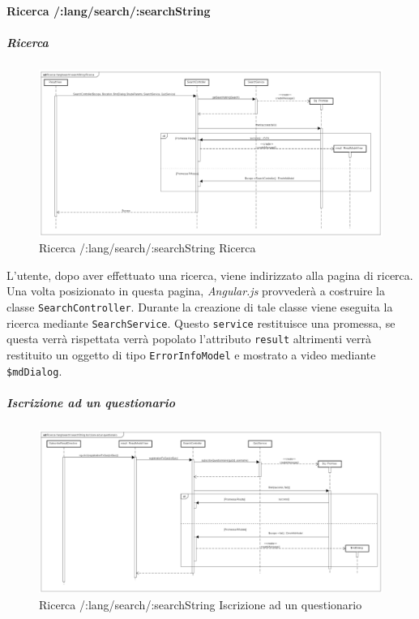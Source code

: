 \paragraph{Ricerca /:lang/search/:searchString}

\subparagraph{Ricerca}

\label{Ricerca /:lang/search/:searchString Ricerca}

\begin{figure}[ht]
	\centering
	\includegraphics[scale=0.275,keepaspectratio]{UML/DiagrammiDiSequenza/Front-End/Search.png}
	\caption{Ricerca /:lang/search/:searchString Ricerca}
\end{figure} \FloatBarrier

L'utente, dopo aver effettuato una ricerca, viene indirizzato alla pagina di ricerca. Una volta posizionato in questa pagina, \textit{Angular.js} provvederà a costruire la classe \texttt{SearchController}. Durante la creazione di tale classe viene eseguita la ricerca mediante \texttt{SearchService}. Questo \texttt{service} restituisce una promessa, se questa verrà rispettata verrà popolato l'attributo \texttt{result} altrimenti verrà restituito un oggetto di tipo \texttt{ErrorInfoModel} e mostrato a video mediante \texttt{\$mdDialog}.

\subparagraph{Iscrizione ad un questionario}

\label{Ricerca /:lang/search/:searchString Iscrizione ad un questionario}

\begin{figure}[ht]
	\centering
	\includegraphics[scale=0.275,keepaspectratio]{UML/DiagrammiDiSequenza/Front-End/Search_subscribeToQuiz.png}
	\caption{Ricerca /:lang/search/:searchString Iscrizione ad un questionario}
\end{figure} \FloatBarrier

